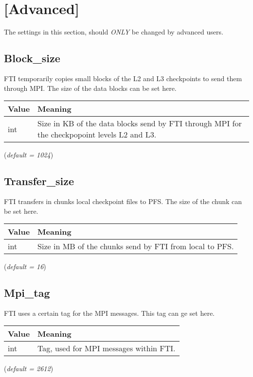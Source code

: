 \documentclass{refrep}
\begin{document}
\section{[Advanced]}\label{sec:advanced}
The settings in this section, should \emph{ONLY} be changed by advanced users.
\subsection{Block\_size}\label{subsec:blocksize}
FTI temporarily copies small blocks of the L2 and L3 checkpoints to send them through MPI. The size of the data blocks can be set here.
\begin{center}
\begin{tabular}[h!]{|p{}|p{}|}
\hline
\textbf{Value} & \textbf{Meaning} \\ \hline
int & Size in KB of the data blocks send by FTI through MPI for the checkpopoint levels L2 and L3. \\ \hline
\end{tabular}
\end{center}
(\textit{default = 1024})
\subsection{Transfer\_size}\label{subsec:transfersize}
FTI transfers in chunks local checkpoint files to PFS. The size of the chunk can be set here.
\begin{center}
\begin{tabular}[h!]{|p{}|p{}|}
\hline
\textbf{Value} & \textbf{Meaning} \\ \hline
int & Size in MB of the chunks send by FTI from local to PFS. \\ \hline
\end{tabular}
\end{center}
(\textit{default = 16})
\subsection{Mpi\_tag}\label{subsec:mpitag}
FTI uses a certain tag for the MPI messages. This tag can ge set here.
\begin{center}
\begin{tabular}[h!]{|p{}|p{}|}
\hline
\textbf{Value} & \textbf{Meaning} \\ \hline
int & Tag, used for MPI messages within FTI. \\ \hline
\end{tabular}
\end{center}
(\textit{default = 2612})
\end{document}

